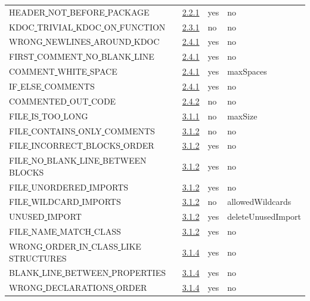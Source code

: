 \begin{longtable}{ |l|p{0.8cm}|p{0.8cm}| p{3cm} | }
HEADER\underline{ }NOT\underline{ }BEFORE\underline{ }PACKAGE & \hyperref[sec:2.2.1]{2.2.1} &  yes  &   no  \\
KDOC\underline{ }TRIVIAL\underline{ }KDOC\underline{ }ON\underline{ }FUNCTION & \hyperref[sec:2.3.1]{2.3.1} &  no  &   no  \\
WRONG\underline{ }NEWLINES\underline{ }AROUND\underline{ }KDOC & \hyperref[sec:2.4.1]{2.4.1} &  yes  &   no  \\
FIRST\underline{ }COMMENT\underline{ }NO\underline{ }BLANK\underline{ }LINE & \hyperref[sec:2.4.1]{2.4.1} &  yes  &   no  \\
COMMENT\underline{ }WHITE\underline{ }SPACE & \hyperref[sec:2.4.1]{2.4.1} &  yes  &   maxSpaces  \\
IF\underline{ }ELSE\underline{ }COMMENTS & \hyperref[sec:2.4.1]{2.4.1} &  yes  &   no  \\
COMMENTED\underline{ }OUT\underline{ }CODE & \hyperref[sec:2.4.2]{2.4.2} &  no  &   no  \\
FILE\underline{ }IS\underline{ }TOO\underline{ }LONG & \hyperref[sec:3.1.1]{3.1.1} &  no  &   maxSize  \\
FILE\underline{ }CONTAINS\underline{ }ONLY\underline{ }COMMENTS & \hyperref[sec:3.1.2]{3.1.2} &  no  &   no  \\
FILE\underline{ }INCORRECT\underline{ }BLOCKS\underline{ }ORDER & \hyperref[sec:3.1.2]{3.1.2} &  yes  &   no  \\
FILE\underline{ }NO\underline{ }BLANK\underline{ }LINE\underline{ }BETWEEN\underline{ }BLOCKS & \hyperref[sec:3.1.2]{3.1.2} &  yes  &   no  \\
FILE\underline{ }UNORDERED\underline{ }IMPORTS & \hyperref[sec:3.1.2]{3.1.2} &  yes  &   no  \\
FILE\underline{ }WILDCARD\underline{ }IMPORTS & \hyperref[sec:3.1.2]{3.1.2} &  no  &   allowedWildcards           \\
UNUSED\underline{ }IMPORT & \hyperref[sec:3.1.2]{3.1.2} &  yes  &   deleteUnusedImport           \\
FILE\underline{ }NAME\underline{ }MATCH\underline{ }CLASS & \hyperref[sec:3.1.2]{3.1.2} &  yes  &   no  \\
WRONG\underline{ }ORDER\underline{ }IN\underline{ }CLASS\underline{ }LIKE\underline{ }STRUCTURES & \hyperref[sec:3.1.4]{3.1.4} &  yes  &   no  \\
BLANK\underline{ }LINE\underline{ }BETWEEN\underline{ }PROPERTIES & \hyperref[sec:3.1.4]{3.1.4} &  yes  &   no  \\
WRONG\underline{ }DECLARATIONS\underline{ }ORDER & \hyperref[sec:3.1.4]{3.1.4} &  yes  &   no  \\

\end{longtable}
